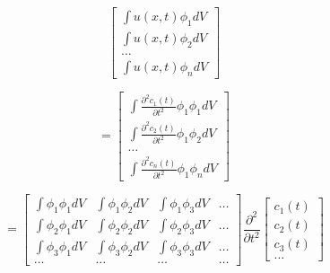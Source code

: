 $$\begin{bmatrix}
\int u(x,t) \phi_1 dV \\
\int u(x,t) \phi_2 dV \\
\ldots \\
\int u(x,t) \phi_n dV
\end{bmatrix}$$

$$= \begin{bmatrix}
\int \frac{\partial^2 c_1(t)}{\partial t^2} \phi_1 \phi_1 dV \\
\int \frac{\partial^2 c_2(t)}{\partial t^2} \phi_1 \phi_2 dV \\
\ldots \\
\int \frac{\partial^2 c_n(t)}{\partial t^2} \phi_1 \phi_n dV
\end{bmatrix}$$

$$= \begin{bmatrix}
    \int \phi_1 \phi_1 dV & \int \phi_1 \phi_2 dV & \int \phi_1 \phi_3 dV & \ldots \\
    \int \phi_2 \phi_1 dV & \int \phi_2 \phi_2 dV & \int \phi_2 \phi_3 dV & \ldots \\
    \int \phi_3 \phi_1 dV & \int \phi_3 \phi_2 dV & \int \phi_3 \phi_3 dV & \ldots \\
    \ldots & \ldots & \ldots & \ldots 
\end{bmatrix} 
\frac{\partial^2}{\partial t^2} 
\begin{bmatrix}
    c_1(t) \\
    c_2(t) \\
    c_3(t) \\
    \ldots
\end{bmatrix} $$



